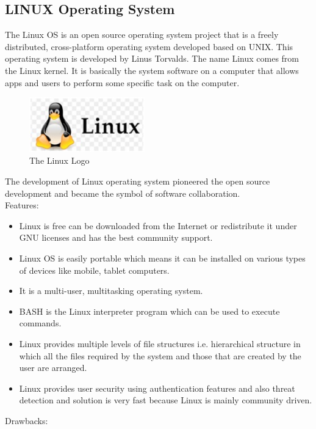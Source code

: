 \documentclass[11pt,a4paper,twoside]{article}
\begin{document}
\subsection{LINUX Operating System}
The Linux OS is an open source operating system project that is a freely distributed, cross-platform operating system developed based on UNIX. This operating system is developed by Linus Torvalds. The name Linux comes from the Linux kernel. It is basically the system software on a computer that allows apps and users to perform some specific task on the computer.\par
\begin{figure}
\includegraphics[width=5cm]{Fig 5.jpg}
\caption{The Linux Logo}
\end{figure}
The development of Linux operating system pioneered the open source development and became the symbol of software collaboration.\\
\newline
Features:
\begin{itemize}
\item Linux is free can be downloaded from the Internet or redistribute it under GNU licenses and has the best community support.
\item Linux OS is easily portable which means it can be installed on various types of devices like mobile, tablet computers.
\item It is a multi-user, multitasking operating system.
\item BASH is the Linux interpreter program which can be used to execute commands.
\item Linux provides multiple levels of file structures i.e. hierarchical structure in which all the files required by the system and those that are created by the user are arranged.
\item Linux provides user security using authentication features and also threat detection and solution is very fast because Linux is mainly community driven.
\end{itemize}	
Drawbacks:
\end{document}
